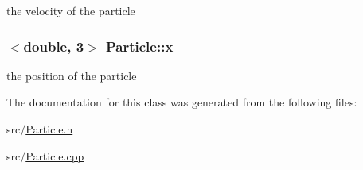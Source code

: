 the velocity of the particle \hypertarget{classParticle_a3789900d6fe19a75d3a82cd5e9622c4c}{
\subsubsection[{x}]{$<$double, 3$>$ Particle\-::x\hspace{0.3cm}{\ttfamily [private]}}}\label{classParticle_a3789900d6fe19a75d3a82cd5e9622c4c}
the position of the particle 

The documentation for this class was generated from the following files\-:\begin{DoxyCompactItemize}
\item 
src/\hyperlink{Particle_8h}{Particle.\-h}\item 
src/\hyperlink{Particle_8cpp}{Particle.\-cpp}\end{DoxyCompactItemize}

